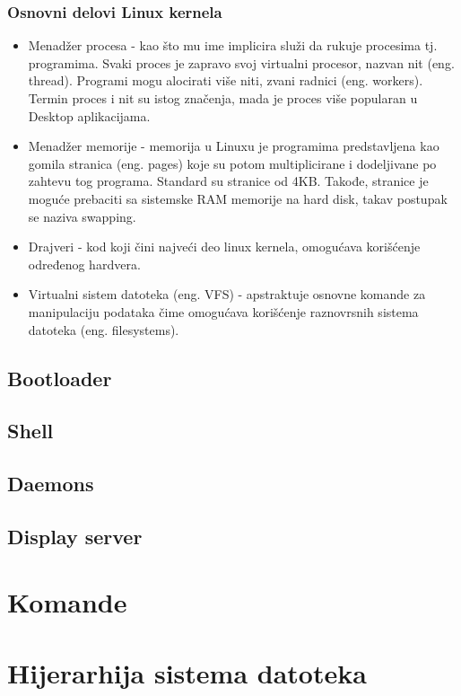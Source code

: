 \documentclass[a4paper,14pt]{article}
\begin{document}
\subsubsection{Osnovni delovi Linux kernela}
\begin{itemize}
\item Menadžer procesa - kao što mu ime implicira služi da rukuje procesima tj. programima. Svaki proces je zapravo svoj virtualni procesor, nazvan nit (eng. thread). Programi mogu alocirati više niti, zvani radnici (eng. workers). Termin proces i nit su istog značenja, mada je proces više popularan u Desktop aplikacijama.
\item Menadžer memorije - memorija u Linuxu je programima predstavljena kao gomila stranica (eng. pages) koje su potom multiplicirane i dodeljivane po zahtevu tog programa. Standard su stranice od 4KB. Takođe, stranice je moguće prebaciti sa sistemske RAM memorije na hard disk, takav postupak se naziva swapping.
\item Drajveri - kod koji čini najveći deo linux kernela, omogućava korišćenje određenog hardvera.
\item Virtualni sistem datoteka (eng. VFS) - apstraktuje osnovne komande za manipulaciju podataka čime omogućava korišćenje raznovrsnih sistema datoteka (eng. filesystems).
\end{itemize}
\newpage

\subsection{Bootloader}
\newpage
\subsection{Shell}
\newpage
\subsection{Daemons}
\newpage
\subsection{Display server}
\newpage

\section{Komande}
\newpage

\section{Hijerarhija sistema datoteka}
\newpage
\end{document}
